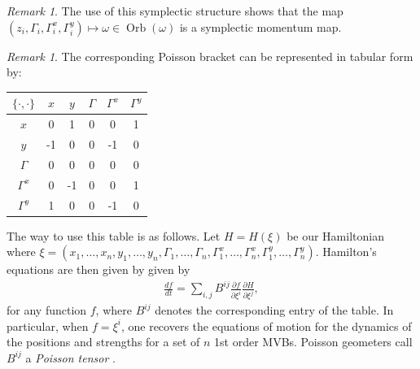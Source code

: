 \documentclass[12pt]{amsart}
\newcommand{\pder}[2]{\ensuremath{\frac{ \partial #1}{\partial #2}}}
\theoremstyle{remark}
\newtheorem{rmk}[thm]{Remark}
\DeclareMathOperator{\Orb}{Orb}
\begin{document}
\begin{rmk}
  The use of this symplectic structure shows that the map $(z_i, \Gamma_i,\Gamma_i^x,\Gamma_i^y) \mapsto \omega \in \Orb(\omega)$ is a symplectic momentum map.
\end{rmk}

\begin{rmk}
The corresponding Poisson bracket can be represented in tabular form by:
\begin{center}
\begin{tabular}{|c|c|c|c|c|c|}
\hline
	$\{ \cdot , \cdot \}$ & $x$ & $y$ & $\Gamma$ & $\Gamma^x$  & $\Gamma^y$ \\ \hline
	$x$ & 0 & 1 & 0 & 0 & 1 \\ \hline
	$y$ & -1 & 0 & 0 & -1 & 0 \\ \hline 
	$\Gamma$ & 0 & 0 & 0 & 0 & 0 \\ \hline
	$\Gamma^x$ & 0 & -1 & 0 & 0 & 1 \\ \hline
	$\Gamma^y$ & 1 & 0 & 0 & -1 & 0  \\ \hline
\end{tabular}
\end{center}

The way to use this table is as follows.  Let $H = H(\xi)$ be our Hamiltonian where
$\xi = (x_1,\dots,x_n,y_1,\dots,y_n,\Gamma_1,\dots,\Gamma_n,\Gamma_1^x,\dots,\Gamma_n^x,\Gamma_1^y,\dots,\Gamma_n^y)$.
Hamilton's equations are then given by
given by
\begin{align*}
	\frac{df}{dt} = \sum_{i,j} B^{ij} \pder{f}{\xi^i} \pder{H}{\xi^j},
\end{align*}
for any function $f$, where $B^{ij}$ denotes the corresponding entry of the table.
In particular, when $f=\xi^i$, one recovers the equations of motion for the dynamics
of the positions and strengths for a set of $n$ 1st order MVBs. 
Poisson geometers call $B^{ij}$ a \emph{Poisson tensor} \cite{FOM}.
\end{rmk}
\end{document}
